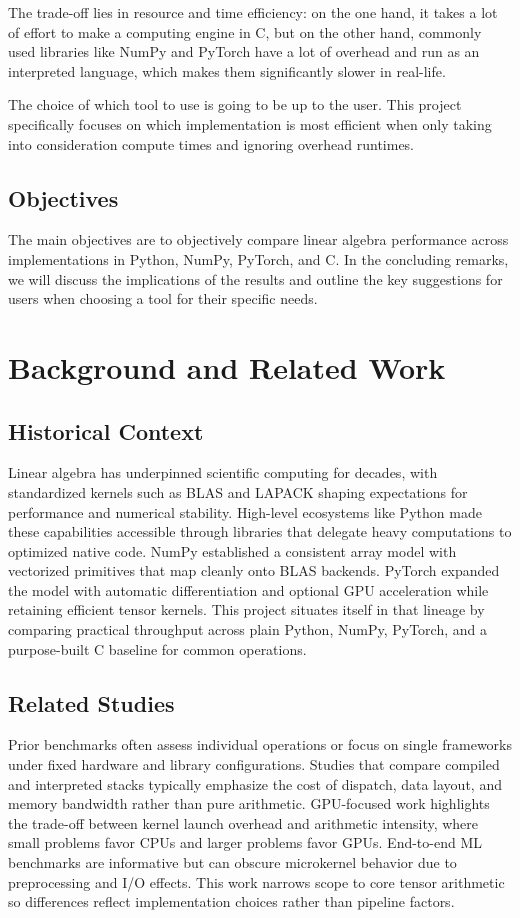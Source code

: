 \documentclass[a4paper,12pt]{article}
\begin{document}
The trade-off lies in resource and time efficiency: on the one hand, it takes a lot of effort to make a computing engine in C, but on the other hand, commonly used libraries like NumPy and PyTorch have a lot of overhead and run as an interpreted language, which makes them significantly slower in real-life.

The choice of which tool to use is going to be up to the user. This project specifically focuses on which implementation is most efficient when only taking into consideration compute times and ignoring overhead runtimes.

\subsection{Objectives}
The main objectives are to objectively compare linear algebra performance across implementations in Python, NumPy, PyTorch, and C. In the concluding remarks, we will discuss the implications of the results and outline the key suggestions for users when choosing a tool for their specific needs.

\section{Background and Related Work}
\subsection{Historical Context}
Linear algebra has underpinned scientific computing for decades, with standardized kernels such as BLAS and LAPACK shaping expectations for performance and numerical stability. High-level ecosystems like Python made these capabilities accessible through libraries that delegate heavy computations to optimized native code. NumPy established a consistent array model with vectorized primitives that map cleanly onto BLAS backends. PyTorch expanded the model with automatic differentiation and optional GPU acceleration while retaining efficient tensor kernels. This project situates itself in that lineage by comparing practical throughput across plain Python, NumPy, PyTorch, and a purpose-built C baseline for common operations.

\subsection{Related Studies}
Prior benchmarks often assess individual operations or focus on single frameworks under fixed hardware and library configurations. Studies that compare compiled and interpreted stacks typically emphasize the cost of dispatch, data layout, and memory bandwidth rather than pure arithmetic. GPU-focused work highlights the trade-off between kernel launch overhead and arithmetic intensity, where small problems favor CPUs and larger problems favor GPUs. End-to-end ML benchmarks are informative but can obscure microkernel behavior due to preprocessing and I/O effects. This work narrows scope to core tensor arithmetic so differences reflect implementation choices rather than pipeline factors.
\end{document}
